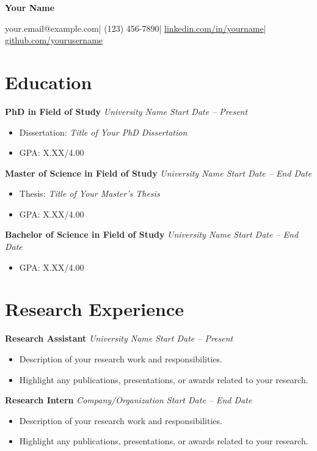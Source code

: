 \documentclass[a4paper,12pt]{article}
\makeatletter
\newcommand{\cvsection}[1]{\section*{#1}}
\newcommand{\cvitem}[2]{\textbf{#1} \hfill \textit{#2}}
\newcommand{\name}{Your Name}
\newcommand{\email}{your.email@example.com}
\newcommand{\phone}{(123) 456-7890}
\newcommand{\linkedin}{\href{https://www.linkedin.com/in/yourname}{linkedin.com/in/yourname}}
\newcommand{\github}{\href{https://github.com/yourusername}{github.com/yourusername}}
\makeatother
\begin{document}
\begin{center}
    \textbf{\Huge{\name}}
    
    \vspace{4pt}
    
    \email \quad | \quad \phone \quad | \quad \linkedin \quad | \quad \github
\end{center}

\cvsection{Education}
\cvitem{PhD in Field of Study}{University Name \hfill Start Date -- Present}
\begin{itemize}[leftmargin=*, itemsep=0pt]
    \item Dissertation: \textit{Title of Your PhD Dissertation}
    \item GPA: X.XX/4.00
\end{itemize}

\cvitem{Master of Science in Field of Study}{University Name \hfill Start Date -- End Date}
\begin{itemize}[leftmargin=*, itemsep=0pt]
    \item Thesis: \textit{Title of Your Master's Thesis}
    \item GPA: X.XX/4.00
\end{itemize}

\cvitem{Bachelor of Science in Field of Study}{University Name \hfill Start Date -- End Date}
\begin{itemize}[leftmargin=*, itemsep=0pt]
    \item GPA: X.XX/4.00
\end{itemize}

\cvsection{Research Experience}
\cvitem{Research Assistant}{University Name \hfill Start Date -- Present}
\begin{itemize}[leftmargin=*, itemsep=0pt]
    \item Description of your research work and responsibilities.
    \item Highlight any publications, presentations, or awards related to your research.
\end{itemize}

\cvitem{Research Intern}{Company/Organization \hfill Start Date -- End Date}
\begin{itemize}[leftmargin=*, itemsep=0pt]
    \item Description of your research work and responsibilities.
    \item Highlight any publications, presentations, or awards related to your research.
\end{itemize}
\end{document}
